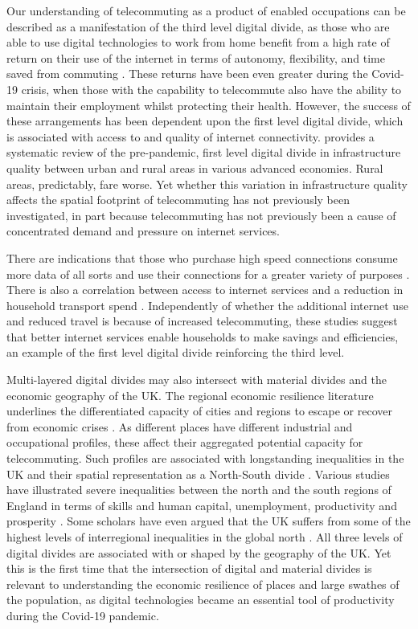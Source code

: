 \documentclass[Royal,times,sageh]{sagej}
\begin{document}
Our understanding of telecommuting as a product of enabled occupations
can be described as a manifestation of the third level digital divide,
as those who are able to use digital technologies to work from home
benefit from a high rate of return on their use of the internet in terms
of autonomy, flexibility, and time saved from commuting
\citep{peters2004employees, siha2006telecommuting, singh2013modeling}.
These returns have been even greater during the Covid-19 crisis, when
those with the capability to telecommute also have the ability to
maintain their employment whilst protecting their health. However, the
success of these arrangements has been dependent upon the first level
digital divide, which is associated with access to and quality of
internet connectivity. \citet{SALEMINK2017360} provides a systematic
review of the pre-pandemic, first level digital divide in infrastructure
quality between urban and rural areas in various advanced economies.
Rural areas, predictably, fare worse. Yet whether this variation in
infrastructure quality affects the spatial footprint of telecommuting
has not previously been investigated, in part because telecommuting has
not previously been a cause of concentrated demand and pressure on
internet services.

There are indications that those who purchase high speed connections
consume more data of all sorts and use their connections for a greater
variety of purposes \citep{hauge2011consumer}. There is also a
correlation between access to internet services and a reduction in
household transport spend \citep{bris2017ict}. Independently of whether
the additional internet use and reduced travel is because of increased
telecommuting, these studies suggest that better internet services
enable households to make savings and efficiencies, an example of the
first level digital divide reinforcing the third level.

Multi-layered digital divides may also intersect with material divides
and the economic geography of the UK. The regional economic resilience
literature underlines the differentiated capacity of cities and regions
to escape or recover from economic crises
\citep{martin2012regional, kitsos2018economic}. As different places have
different industrial and occupational profiles, these affect their
aggregated potential capacity for telecommuting. Such profiles are
associated with longstanding inequalities in the UK and their spatial
representation as a North-South divide \citep{martin_north_south}.
Various studies have illustrated severe inequalities between the north
and the south regions of England in terms of skills and human capital,
unemployment, productivity and prosperity
\citep{lee2014grim, mccann2020perceptions, dorling2018peak}. Some
scholars have even argued that the UK suffers from some of the highest
levels of interregional inequalities in the global north
\citep{gal2018reducing, mccann2016uk}. All three levels of digital
divides are associated with or shaped by the geography of the UK. Yet
this is the first time that the intersection of digital and material
divides is relevant to understanding the economic resilience of places
and large swathes of the population, as digital technologies became an
essential tool of productivity during the Covid-19 pandemic.
\end{document}
